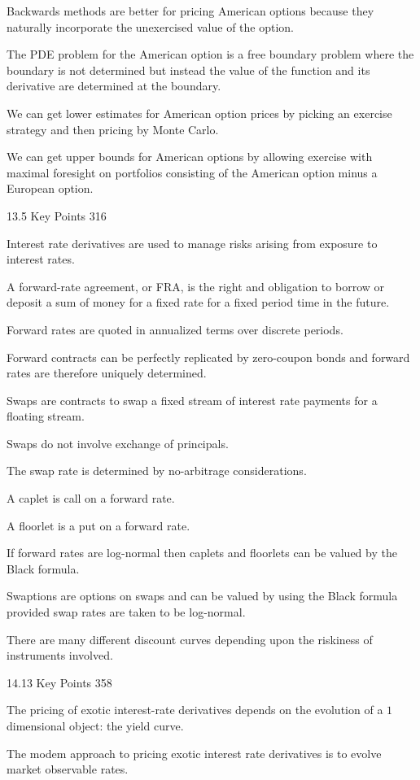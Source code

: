 Backwards methods are better for pricing American options because they naturally incorporate the unexercised value of the option.

The PDE problem for the American option is a free boundary problem where the boundary is not determined but instead the value of the function and its derivative are determined at the boundary.

We can get lower estimates for American option prices by picking an exercise strategy and then pricing by Monte Carlo.

We can get upper bounds for American options by allowing exercise with maximal foresight on portfolios consisting of the American option minus a European option.

13.5 Key Points 316

Interest rate derivatives are used to manage risks arising from exposure to interest rates.

A forward-rate agreement, or FRA, is the right and obligation to borrow or deposit a sum of money for a fixed rate for a fixed period time in the future.

Forward rates are quoted in annualized terms over discrete periods.

Forward contracts can be perfectly replicated by zero-coupon bonds and forward rates are therefore uniquely determined.

Swaps are contracts to swap a fixed stream of interest rate payments for a floating stream.

Swaps do not involve exchange of principals.

The swap rate is determined by no-arbitrage considerations.

A caplet is call on a forward rate.

A floorlet is a put on a forward rate.

If forward rates are log-normal then caplets and floorlets can be valued by the Black formula.

Swaptions are options on swaps and can be valued by using the Black formula provided swap rates are taken to be log-normal.

There are many different discount curves depending upon the riskiness of instruments involved.

14.13 Key Points 358

The pricing of exotic interest-rate derivatives depends on the evolution of a $1$ dimensional object: the yield curve.

The modem approach to pricing exotic interest rate derivatives is to evolve market observable rates.


